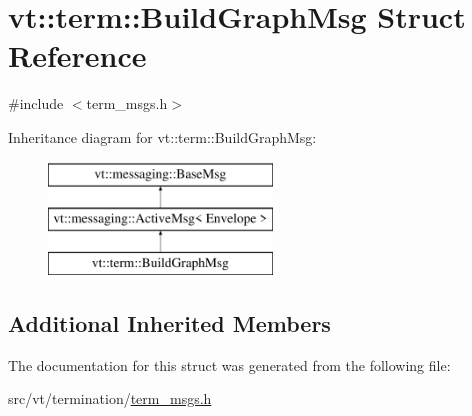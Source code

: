 \hypertarget{structvt_1_1term_1_1_build_graph_msg}{}\section{vt\+:\+:term\+:\+:Build\+Graph\+Msg Struct Reference}
\label{structvt_1_1term_1_1_build_graph_msg}


{\ttfamily \#include $<$term\+\_\+msgs.\+h$>$}

Inheritance diagram for vt\+:\+:term\+:\+:Build\+Graph\+Msg\+:\begin{figure}[H]
\begin{center}
\leavevmode
\includegraphics[height=3.000000cm]{structvt_1_1term_1_1_build_graph_msg}
\end{center}
\end{figure}
\subsection*{Additional Inherited Members}


The documentation for this struct was generated from the following file\+:\begin{DoxyCompactItemize}
\item 
src/vt/termination/\hyperlink{term__msgs_8h}{term\+\_\+msgs.\+h}\end{DoxyCompactItemize}
